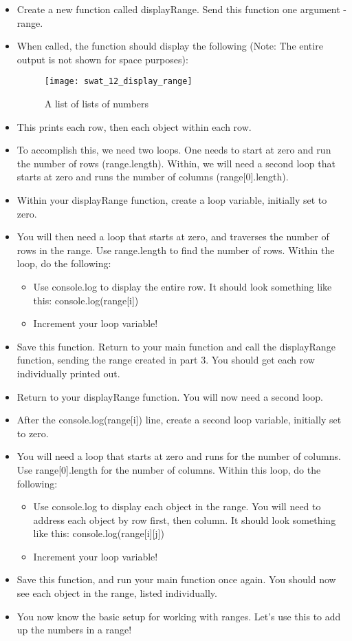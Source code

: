 \documentclass{article}
\begin{document}
\begin{itemize}
    \item Create a new function called displayRange.  Send this function one argument - range.
    \item When called, the function should display the following (Note:  The entire output is not shown for space purposes):
    \begin{figure}[H]
  		\centering
  		\texttt{[image: swat\_12\_display\_range]}
  		\caption{A list of lists of numbers}
	\end{figure}
	\item This prints each row, then each object within each row. 
    \item To accomplish this, we need two loops.  One needs to start at zero and run the number of rows (range.length).  Within, we will need a second loop that starts at zero and runs the number of columns (range[0].length).
    \item Within your displayRange function, create a loop variable, initially set to zero.
    	\item You will then need a loop that starts at zero, and traverses the number of rows in the range.  Use range.length to find the number of rows. Within the loop, do the following:
    	\begin{itemize}
    		\item Use console.log to display the entire row.  It should look something like this:  console.log(range[i])  
    		\item Increment your loop variable!
    	\end{itemize}
    	\item Save this function.  Return to your main function and call the displayRange function, sending the range created in part 3.  You should get each row individually printed out.
    	\item Return to your displayRange function.  You will now need a second loop.  
    	\item After the console.log(range[i]) line, create a second loop variable, initially set to zero.  
    	\item You will need a loop that starts at zero and runs for the number of columns.  Use range[0].length for the number of columns.  Within this loop, do the following:
    	\begin{itemize}
    		\item Use console.log to display each object in the range.  You will need to address each object by row first, then column.  It should look something like this:  console.log(range[i][j])  
    		\item Increment your loop variable!
    	\end{itemize}
    	\item Save this function, and run your main function once again.  You should now see each object in the range, listed individually.
    	\item You now know the basic setup for working with ranges.  Let's use this to add up the numbers in a range! 
\end{itemize}
\end{document}
